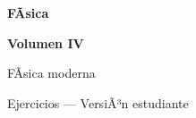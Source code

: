 ﻿\documentclass[11pt,letterpaper,openany]{book}
\newcommand{\rutaraiz}{../..}
\newcommand{\numerovolumen}{IV}
\newcommand{\nombrevolumen}{FÃ­sica moderna}
\begin{document}

\begin{titlepage}

    \centering

    \vspace*{2.5cm}

    {\color{RojoPrincipal}
    \Huge\bfseries
    FÃ­sica
    \par}

    \vspace{0.8cm}

    {\color{AzulPrincipal}
    \LARGE\bfseries
    Volumen \numerovolumen
    \par}

    \vspace{0.5cm}

    {\Large
    \nombrevolumen
    \par}

    \vspace{1.5cm}

    {\color{AzulPrincipal}
    \Large
    Ejercicios --- VersiÃ³n estudiante
    \par}

    \vfill

    {\Large\bfseries
    \autorlibro
    \par}

    \vspace{2cm}

\end{titlepage}



\frontmatter

\tableofcontents

\cleardoublepage



\mainmatter

%
%
%
%
%
%
%
%
% 
\end{document}
